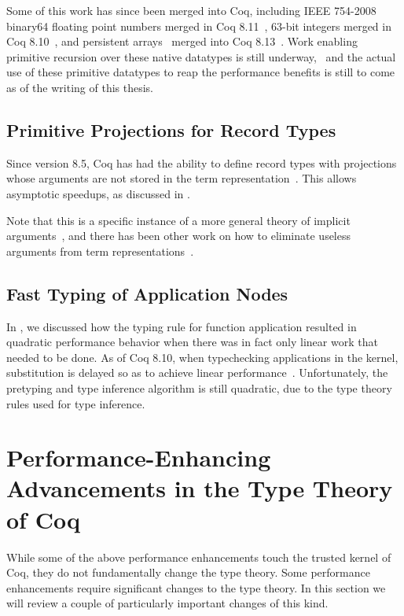 Some of this work has since been merged into Coq, including IEEE 754-2008 binary64 floating point numbers merged in Coq 8.11~\cite{coq-pr-floats}, 63-bit integers merged in Coq 8.10~\cite{coq-pr-int63}, and persistent arrays~\cite{Persistent2007Conchon} merged into Coq 8.13~\cite{coq-pr-parray}.
Work enabling primitive recursion over these native datatypes is still underway,~\cite{coq-pr-parray-prim-recursion} and the actual use of these primitive datatypes to reap the performance benefits is still to come as of the writing of this thesis.

\subsection{Primitive Projections for Record Types}\label{sec:fixes:theory:primitive-projections}\label{sec:primitive-projections}
Since version 8.5, Coq has had the ability to define record types with projections whose arguments are not stored in the term representation~\cite{coq-commit-polyproj}.
This allows asymptotic speedups, as discussed in .

Note that this is a specific instance of a more general theory of implicit arguments~\cite{logical2001implicit,barras2008implicit}, and there has been other work on how to eliminate useless arguments from term representations~\cite{Inductive2003Brady}.

\subsection{Fast Typing of Application Nodes}
In , we discussed how the typing rule for function application resulted in quadratic performance behavior when there was in fact only linear work that needed to be done.
As of Coq 8.10, when typechecking applications in the kernel, substitution is delayed so as to achieve linear performance~\cite{coq-pr-fast-application-typing}.
Unfortunately, the pretyping and type inference algorithm is still quadratic, due to the type theory rules used for type inference.


\section{Performance-Enhancing Advancements in the Type Theory of Coq}\label{sec:fixes:coq-theory}
While some of the above performance enhancements touch the trusted kernel of Coq, they do not fundamentally change the type theory.
Some performance enhancements require significant changes to the type theory.
In this section we will review a couple of particularly important changes of this kind.

